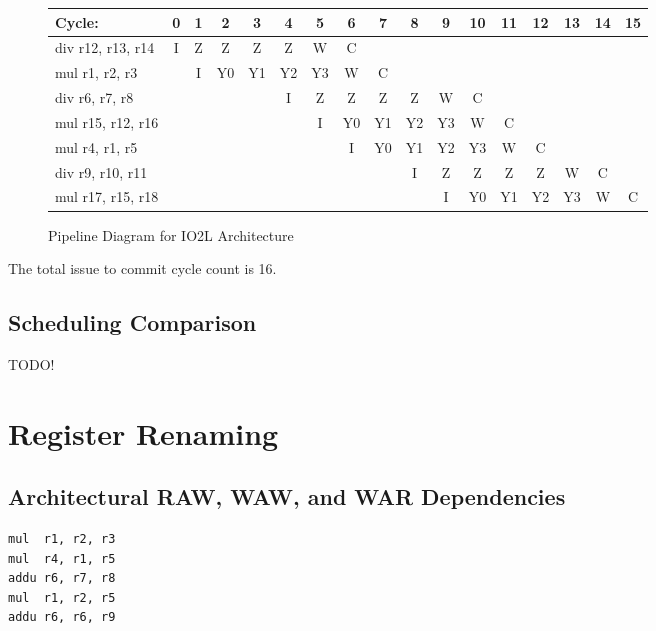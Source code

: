 \documentclass[10pt]{article}
\begin{document}
\begin{figure}[H]
\centering
{\setlength{\tabcolsep}{2pt}
\begin{tabular}{|l!{\vrule width 1.5pt}c|c|c|c|c|c|c|c|c|c|c|c|c|c|c|c!{\vrule width 1.5pt}}
\hline
Cycle:            & 0 & 1 & 2 & 3 & 4 & 5 & 6 & 7 & 8 & 9 & 10 & 11 & 12 & 13 & 14 & 15 \\ \hline
div r12, r13, r14 & I & Z & Z & Z & Z & W & C &   &   &   &    &    &    &    &    &    \\ \hline
mul r1, r2, r3    &   & I & Y0& Y1& Y2& Y3& W & C &   &   &    &    &    &    &    &    \\ \hline
div r6, r7, r8    &   &   &   &   & I & Z & Z & Z & Z & W & C  &    &    &    &    &    \\ \hline
mul r15, r12, r16 &   &   &   &   &   & I & Y0& Y1& Y2& Y3& W  & C  &    &    &    &    \\ \hline
mul r4, r1, r5    &   &   &   &   &   &   & I & Y0& Y1& Y2& Y3 & W  & C  &    &    &    \\ \hline
div r9, r10, r11  &   &   &   &   &   &   &   &   & I & Z & Z  & Z  & Z  & W  & C  &    \\ \hline
mul r17, r15, r18 &   &   &   &   &   &   &   &   &   & I & Y0 & Y1 & Y2 & Y3 & W  & C  \\ \hline
\end{tabular}
}
\caption{Pipeline Diagram for IO2L Architecture}
\end{figure}

The total issue to commit cycle count is 16.

\subsection{Scheduling Comparison}

TODO!

\cleardoublepage
\section{Register Renaming}

\subsection{Architectural RAW, WAW, and WAR Dependencies}

\begin{lstlisting}
mul  r1, r2, r3
mul  r4, r1, r5
addu r6, r7, r8
mul  r1, r2, r5
addu r6, r6, r9
\end{lstlisting}
\end{document}
